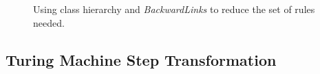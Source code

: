 \begin{figure}[h]
\begin{center}
  \caption{Using class hierarchy and \emph{BackwardLinks} to reduce the set of rules needed.}
  \label{fig:ExecuteAutomataTransformationOutlineRuleSymbol}
\end{center}
\end{figure}



\clearpage
\subsection{Turing Machine Step Transformation}
\label{subsec:turing_machine_trans}

